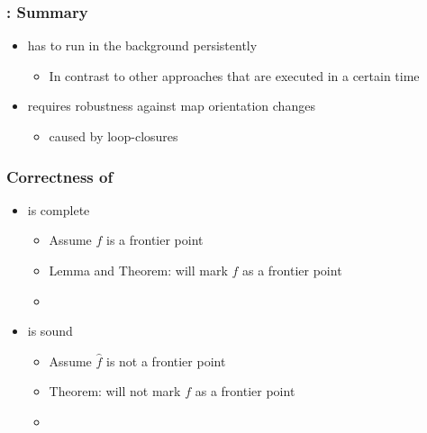 \begin{frame}
\frametitle{\FFD: Summary}
\begin{itemize}
  \item \FFD has to run in the background persistently
  	\begin{itemize}
  	  \item In contrast to other approaches that are executed in a certain time
  	\end{itemize} %
  \item \FFD requires robustness against map orientation changes
  	\begin{itemize}
  	  \item caused by loop-closures %
  	\end{itemize} 
 \end{itemize} 
\end{frame}

\begin{frame}
\label{frame:ffd_sound_complete}
\frametitle{Correctness of \FFD}
\begin{itemize}
  \item \FFD is complete
  \begin{itemize}
    \item Assume $f$ is a frontier point 
    \item Lemma and Theorem: \FFD will mark $f$ as a frontier point
  	\item \hyperlink{frame:ffd_complete}{}
  \end{itemize}
  \item \FFD is sound 
  \begin{itemize}
    \item Assume $\hat{f}$ is not a frontier point 
    \item Theorem: \FFD will not mark $f$ as a frontier point
  	\item \hyperlink{frame:ffd_sound}{}
  \end{itemize}
\end{itemize}
\end{frame}

